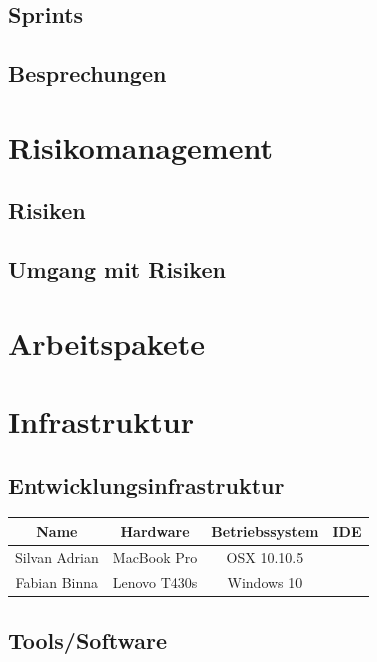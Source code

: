 \documentclass[11pt]{scrartcl}
\begin{document}
\subsection{Sprints}

\subsection{Besprechungen}



\section{Risikomanagement}

\subsection{Risiken}



\subsection{Umgang mit Risiken}

\section{Arbeitspakete}

\section{Infrastruktur}

\subsection{Entwicklungsinfrastruktur}

\begin{tabularx}{\textwidth}{c c c c}
\textbf{Name} & \textbf{Hardware} & \textbf{Betriebssystem} & \textbf{IDE} \\
\hline
Silvan Adrian & MacBook Pro & OSX 10.10.5 &  \\
\hline
Fabian Binna & Lenovo T430s & Windows 10 &  \\
\hline
\end{tabularx}

\subsection{Tools/Software}
\end{document}
